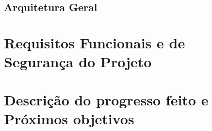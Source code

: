 \documentclass[a4paper,12pt]{article}
\begin{document}
\subsection{Arquitetura Geral}

\section{Requisitos Funcionais e de Segurança do Projeto}

\section{Descrição do progresso feito e Próximos objetivos}


\end{document}
